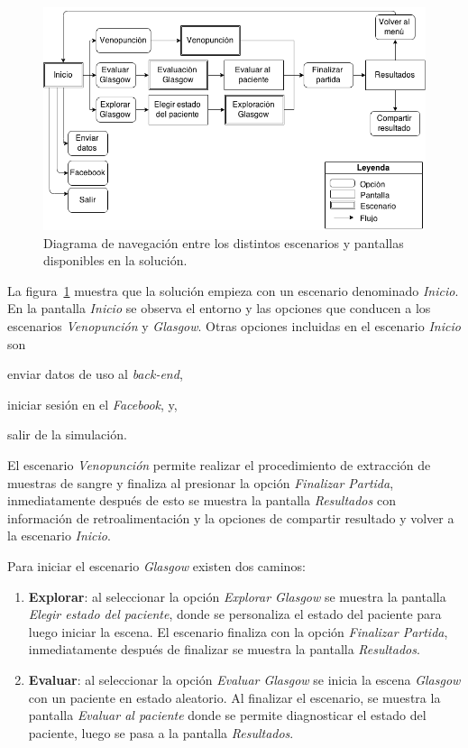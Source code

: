 \begin{figure}[H] 
\centering 
\includegraphics[scale=0.5]{solucion/images/grafo_escenas.png}
\caption{Diagrama de navegación entre los distintos escenarios y pantallas
    disponibles en la solución.}
\label{fig:grafo_estados}
\end{figure}

 
La figura~\ref{fig:grafo_estados} muestra que la solución empieza con un escenario
denominado \emph{Inicio}. En la pantalla \emph{Inicio} se observa el entorno y las
opciones que conducen a los escenarios \emph{Venopunción} y
\emph{Glasgow}. Otras opciones incluidas en el escenario \emph{Inicio} son
\begin{enumerate*}[label=\itshape\alph*\upshape)]
\item enviar datos de uso al \emph{back-end},
\item iniciar sesión en el \emph{Facebook}, y,
\item salir de la simulación.
\end{enumerate*}


El escenario \emph{Venopunción} permite realizar el procedimiento de extracción 
de muestras de sangre y finaliza al presionar la opción
\emph{Finalizar Partida}, inmediatamente después de esto se muestra la pantalla 
\emph{Resultados} con información de retroalimentación y la opciones de compartir 
resultado y volver a la escenario \emph{Inicio}.

Para iniciar el escenario \emph{Glasgow} existen dos caminos:
\begin{enumerate}
\item \textbf{Explorar}: al seleccionar la opción \emph{Explorar
        Glasgow} se muestra la pantalla \emph{Elegir estado del
        paciente}, donde se personaliza el estado del paciente para luego iniciar
    la escena. El escenario finaliza con la opción \emph{Finalizar Partida}, inmediatamente después de 
    finalizar se muestra la pantalla \emph{Resultados}.
\item \textbf{Evaluar}: al seleccionar la opción \emph{Evaluar
        Glasgow} se inicia la escena \emph{Glasgow} con un paciente en estado 
    aleatorio.
    Al finalizar el escenario, se muestra la pantalla \emph{Evaluar al paciente}
    donde se permite diagnosticar el estado del paciente, luego se pasa a la
    pantalla \emph{Resultados}.
\end{enumerate}

